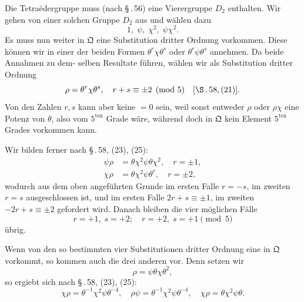 \documentclass[12pt,a4paper]{article}
\theoremstyle{plain}
\theoremstyle{definition}
\theoremstyle{remark}
\begin{document}
Die Tetra\"edergruppe muss (nach \S\,.\,56) eine Vierergruppe $D_2$
enthalten. Wir gehen von einer solchen Gruppe $D_2$ aus und
w\"ahlen dazu
\[
1,\; \psi,\; \chi^2,\; \psi\chi^2.
\]
Es muss nun weiter in $\mathfrak{Q}$ eine Substitution dritter Ordnung
vorkommen. Diese k\"onnen wir in einer der beiden Formen
$\theta^r\chi\theta^s$ oder $\theta^r\psi\theta^s$ annehmen. Da beide Annahmen zu dem-
selben Resultate f\"uhren, w\"ahlen wir als Substitution dritter
Ordnung
\[
\rho = \theta^r\chi\theta^s,\quad r + s \equiv \pm 2 \pmod{5}\quad [\S\,.\,58, (21)].
\]
Von den Zahlen $r, s$ kann aber keine $= 0$ sein, weil sonst
entweder $\rho$ oder $\rho\chi$ eine Potenz von $\theta$, also vom $5^{\text{ten}}$ Grade
w\"are, w\"ahrend doch in $\mathfrak{Q}$ kein Element $5^{\text{ten}}$ Grades vorkommen
kann.

Wir bilden ferner nach \S\,.\,58, (23), (25):
\begin{align*}
\psi\rho &= \theta\chi^2\psi\theta\chi^2,\quad r = \pm 1,\\
\chi\rho &= \theta\chi^2\psi\theta^r,\quad r = \pm 2,
\end{align*}
wodurch aus dem oben angef\"uhrten Grunde im ersten Falle
$r = -s$, im zweiten $r = s$ ausgeschlossen ist, und im ersten
Falle $2r + s \equiv \pm 1$, im zweiten $-2r + s \equiv \pm 2$ gefordert
wird. Danach bleiben die vier m\"oglichen F\"alle
\[
r = +1,\; s = +2;\quad r = +2,\; s = +1 \pmod{5}
\]
\"ubrig.

Wenn von den so bestimmten vier Substitutionen dritter
Ordnung eine in $\mathfrak{Q}$ vorkommt, so kommen auch die drei anderen
vor. Denn setzen wir
\begin{equation}\label{eq:59_1}
\rho = \psi\theta\chi\theta^2,\tag{1}
\end{equation}
so ergiebt sich nach \S\,.\,58, (23), (25):
\begin{equation}\label{eq:59_2}
\chi\rho = \theta^{-1}\chi^2\psi\theta^{-4},\quad \rho\psi = \theta^{-1}\chi^2\psi\theta^{-4},\quad \chi\rho = \theta\chi^2\psi\theta.\tag{2}
\end{equation}
\end{document}
